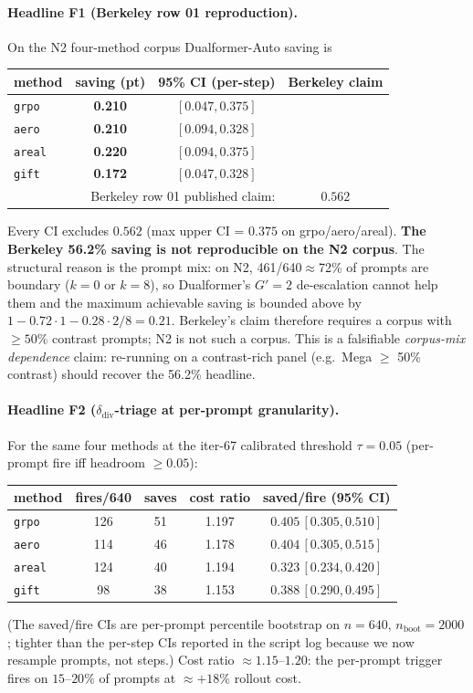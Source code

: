 \paragraph{Headline F1 (Berkeley row 01 reproduction).}
On the N2 four-method corpus Dualformer-Auto saving is
\begin{center}
\begin{tabular}{lccc}
\toprule
method & saving (pt) & 95\% CI (per-step) & Berkeley claim \\
\midrule
\texttt{grpo}  & \textbf{0.210} & $[0.047, 0.375]$ &  \\
\texttt{aero}  & \textbf{0.210} & $[0.094, 0.328]$ &  \\
\texttt{areal} & \textbf{0.220} & $[0.094, 0.375]$ &  \\
\texttt{gift}  & \textbf{0.172} & $[0.047, 0.328]$ &  \\
\midrule
\multicolumn{3}{r}{Berkeley row 01 published claim:} & $0.562$ \\
\bottomrule
\end{tabular}
\end{center}
Every CI excludes $0.562$ (max upper CI = $0.375$ on grpo/aero/areal).
\textbf{The Berkeley 56.2\% saving is not reproducible on the N2 corpus}.
The structural reason is the prompt mix: on N2, 461/640$\approx$72\%
of prompts are boundary ($k{=}0$ or $k{=}8$), so Dualformer's
$G'{=}2$ de-escalation cannot help them and the maximum achievable
saving is bounded above by $1 - 0.72 \cdot 1 - 0.28 \cdot 2/8 = 0.21$.
Berkeley's claim therefore requires a corpus with $\geq 50\%$
contrast prompts; N2 is not such a corpus. This is a falsifiable
\emph{corpus-mix dependence} claim: re-running on a contrast-rich
panel (e.g.\ Mega $\geq$ 50\% contrast) should recover the 56.2\%
headline.

\paragraph{Headline F2 ($\delta_{\mathrm{div}}$-triage at per-prompt granularity).}
For the same four methods at the iter-67 calibrated threshold
$\tau{=}0.05$ (per-prompt fire iff headroom $\geq 0.05$):
\begin{center}
\begin{tabular}{lcccc}
\toprule
method & fires/640 & saves & cost ratio & saved/fire (95\% CI) \\
\midrule
\texttt{grpo}  & 126 & 51 & 1.197 & $0.405\,[0.305,0.510]$ \\
\texttt{aero}  & 114 & 46 & 1.178 & $0.404\,[0.305,0.515]$ \\
\texttt{areal} & 124 & 40 & 1.194 & $0.323\,[0.234,0.420]$ \\
\texttt{gift}  &  98 & 38 & 1.153 & $0.388\,[0.290,0.495]$ \\
\bottomrule
\end{tabular}
\end{center}
(The saved/fire CIs are per-prompt percentile bootstrap on $n{=}640$,
$n_{\mathrm{boot}}{=}2000$; tighter than the per-step CIs reported in
the script log because we now resample prompts, not steps.)  Cost
ratio $\approx 1.15$--$1.20$: the per-prompt trigger fires on $15$--$20\%$
of prompts at $\approx +18\%$ rollout cost.


